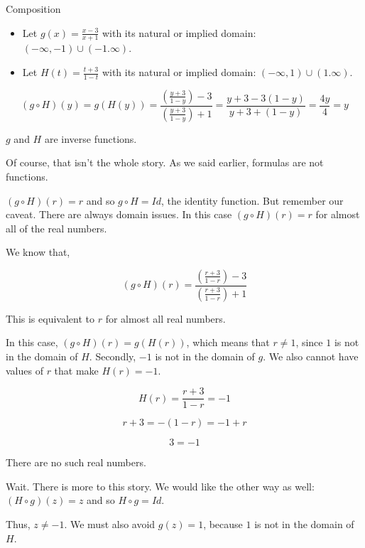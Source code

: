 \documentclass{ximera}
\begin{document}
\begin{example} Composition



\begin{itemize}
\item Let $g(x) = \frac{x-3}{x+1}$ with its natural or implied domain: $(-\infty, -1) \cup (-1. \infty)$. \\

\item Let $H(t) = \frac{t+3}{1-t}$ with its natural or implied domain: $(-\infty, 1) \cup (1. \infty)$.
\end{itemize}



\[
(g \circ H)(y) = g(H(y)) = \frac{\left( \frac{y+3}{1-y} \right) - 3}{\left(  \frac{y+3}{1-y}\right) + 1} = \frac{y+3-3(1-y)}{y+3+(1-y)} = \frac{4y}{4} = y
\]



$g$ and $H$ are inverse functions.




\end{example}

Of course, that isn't the whole story.  As we said earlier, formulas are not functions. 

$(g \circ H)(r) = r$ and so $g \circ H = Id$, the identity function.  But remember our caveat.  There are always domain issues.  In this case $(g \circ H)(r) = r$ for almost all of the real numbers.

We know that, 


\[
(g \circ H)(r) = \frac{\left( \frac{r+3}{1-r} \right) - 3}{\left(  \frac{r+3}{1-r}\right) + 1} 
\]


This is equivalent to $r$ for almost all real numbers.


In this case, $(g \circ H)(r) = g(H(r))$, which means that $r \ne 1$, since $1$ is not in the domain of $H$.  Secondly, $-1$ is not in the domain of $g$.  We also cannot have values of $r$ that make $H(r) = -1$.




\[
H(r) = \frac{r+3}{1-r} = -1
\]

\[
r + 3 = -(1-r) = -1 + r
\]


\[
3 = -1
\]


There are no such real numbers.


Wait.  There is more to this story. We would like the other way as well: $(H \circ g)(z) = z$ and so $H \circ g = Id$.


Thus, $z \ne -1$.  We must also avoid $g(z) = 1$, because $1$ is not in the domain of $H$.
\end{document}
